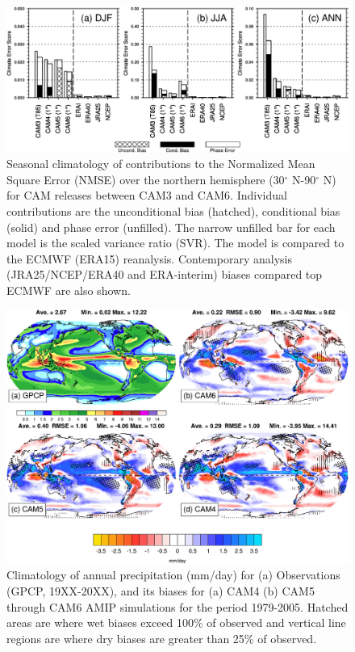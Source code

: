 %
%
%
%
%
%

\clearpage
\begin{figure}[t]
  \begin{center}
    \includegraphics[width=1\textwidth,angle=0.]{./figs/f_skill_score.pdf}
 \end{center}
  \caption {Seasonal climatology of contributions to the Normalized Mean Square Error (NMSE) over the northern hemisphere (30$^\circ$ N-90$^\circ$ N) for CAM releases between CAM3 and CAM6. Individual contributions are the unconditional bias (hatched), conditional bias (solid) and phase error (unfilled). The narrow unfilled bar for each model is the scaled variance ratio (SVR). The model is compared to the ECMWF (ERA15) reanalysis. Contemporary analysis (JRA25/NCEP/ERA40 and ERA-interim) biases compared top ECMWF are also shown.} 
\label{f_skill_score}
\end{figure} 
\clearpage
\begin{figure}[t]
  \begin{center}
    \includegraphics[width=1.\textwidth,angle=90.]{./figs/f_PRECT_2D_CAM456.pdf}
  \end{center}
  \caption{Climatology of annual precipitation (mm/day) for (a) Observations (GPCP, 19XX-20XX), and its biases for (a) CAM4 (b) CAM5  through CAM6 AMIP simulations for the period 1979-2005. Hatched areas are where wet biases exceed 100\% of observed and vertical line regions are where dry biases are greater than 25\% of observed.}
\label{f_PRECT_2D_CAM456}
\end{figure}

